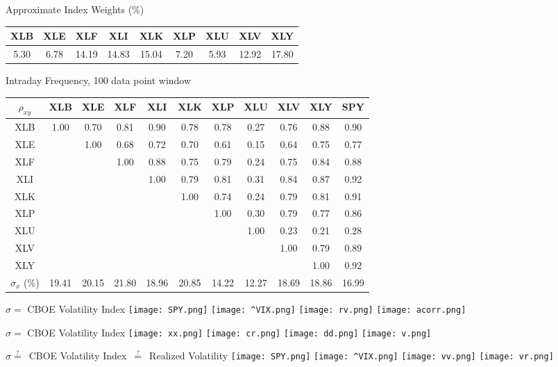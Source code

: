 \documentclass[6pt]{article}
\begin{document}
\begin{center}
Approximate Index Weights (\%) \\
\begin{tabular}{|ccccccccc|}
  \hline
  XLB & XLE & XLF & XLI & XLK & XLP & XLU & XLV & XLY \\
  \hline
  5.30 & 6.78 & 14.19 & 14.83 & 15.04 & 7.20 & 5.93 & 12.92 & 17.80 \\
  \hline
\end{tabular} 
\vspace{0.25in}

Intraday Frequency, 100 data point window \\
\begin{tabular}{|c|ccccccccc||c|}
  \hline
  $\rho_{xy}$ & XLB & XLE & XLF & XLI & XLK & XLP & XLU & XLV & XLY & SPY \\
  \hline
    XLB & 1.00 & 0.70 & 0.81 & 0.90 & 0.78 & 0.78 & 0.27 & 0.76 & 0.88 & 0.90 \\
    XLE & & 1.00 & 0.68 & 0.72 & 0.70 & 0.61 & 0.15 & 0.64 & 0.75 & 0.77 \\
    XLF & & & 1.00 & 0.88 & 0.75 & 0.79 & 0.24 & 0.75 & 0.84 & 0.88 \\
    XLI & & & & 1.00 & 0.79 & 0.81 & 0.31 & 0.84 & 0.87 & 0.92 \\
    XLK & & & & & 1.00 & 0.74 & 0.24 & 0.79 & 0.81 & 0.91 \\
    XLP & & & & & & 1.00 & 0.30 & 0.79 & 0.77 & 0.86 \\
    XLU & & & & & & & 1.00 & 0.23 & 0.21 & 0.28 \\
    XLV & & & & & & & & 1.00 & 0.79 & 0.89 \\
    XLY & & & & & & & & & 1.00 & 0.92 \\
  \hline
  \hline
  $\sigma_{x}$ (\%) & 19.41 & 20.15 & 21.80 & 18.96 & 20.85 & 14.22 & 12.27 & 18.69 & 18.86 & 16.99 \\
  \hline
\end{tabular}

\newpage

\Large{$\sigma=$ CBOE Volatility Index}
\texttt{[image: SPY.png]}
\texttt{[image: ^VIX.png]}
\texttt{[image: rv.png]}
\texttt{[image: acorr.png]}

\newpage

\Large{$\sigma=$ CBOE Volatility Index}
\texttt{[image: xx.png]}
\texttt{[image: cr.png]}
\texttt{[image: dd.png]}
\texttt{[image: v.png]}

\newpage

\Large{$\sigma\overset{?}{=}$\ CBOE Volatility Index\ $\overset{?}{=}$\ Realized Volatility}
\texttt{[image: SPY.png]}
\texttt{[image: ^VIX.png]}
\texttt{[image: vv.png]}
\texttt{[image: vr.png]}


\end{center}
\end{document}
